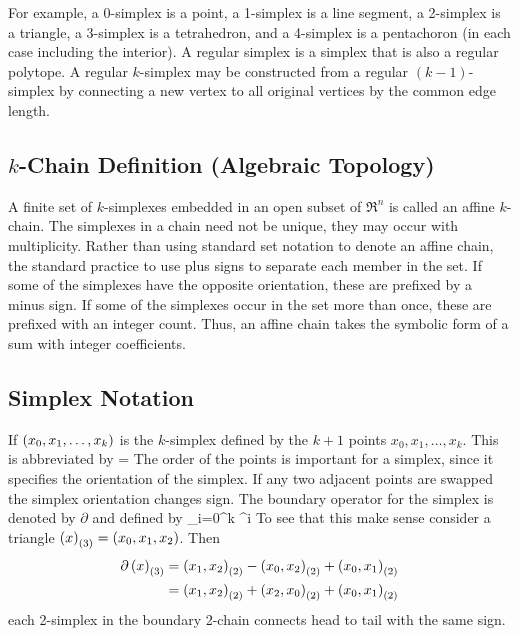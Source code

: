For example, a 0-simplex is a point, a 1-simplex is a line segment, a 2-simplex is a triangle, a 3-simplex is a 
tetrahedron, and a 4-simplex is a pentachoron (in each case including the interior).
A regular simplex is a simplex that is also a regular polytope. A regular $k$-simplex may be constructed from a regular 
$(k-1)$-simplex by connecting a new vertex to all original vertices by the common edge length.

\subsection{$k$-Chain Definition (Algebraic Topology)}

A finite set of $k$-simplexes embedded in an open subset of $\Re^{n}$ is called an affine $k$-chain. The simplexes in a
chain need not be unique, they may occur with multiplicity. Rather than using standard set notation to denote an affine 
chain, the standard practice to use plus signs to separate each member in the set. If some of the simplexes
have the opposite orientation, these are prefixed by a minus sign. If some of the simplexes occur in the set more than once,
these are prefixed with an integer count. Thus, an affine chain takes the symbolic form of a sum with integer coefficients.

\subsection{Simplex Notation}

If $\left ( {x_{0},x_{1},\dots,x_{k}} \right )$ is the $k$-simplex defined by the $k+1$ points 
$x_{0},x_{1},\dots,x_{k}$.  This is abbreviated by
\be
{} = 
\ee 
The order of the points is important for a simplex, since it specifies the orientation of the simplex.  If any two
adjacent points are swapped the simplex orientation changes sign.  The boundary operator for the simplex is denoted by $\partial$
and defined by
\be\label{eq211}
\partial{} \equiv \sum_{i=0}^{k} ^{i}
\ee
To see that this make sense consider a triangle $\left ( {x} \right )_{\left ( {3} \right )} = \left ( {x_{0},x_{1},x_{2}} \right )$. Then
\begin{align}
\partial\left ( {x} \right )_{\left ( {3} \right )} &= \left ( {x_{1},x_{2}} \right )_{\left ( {2} \right )}-\left ( {x_{0},x_{2}} \right )_{\left ( {2} \right )}+\left ( {x_{0},x_{1}} \right )_{\left ( {2} \right )} \nonumber \\
                   &= \left ( {x_{1},x_{2}} \right )_{\left ( {2} \right )}+\left ( {x_{2},x_{0}} \right )_{\left ( {2} \right )}+\left ( {x_{0},x_{1}} \right )_{\left ( {2} \right )}
\end{align}
each 2-simplex in the boundary 2-chain connects head to tail with the same sign.

